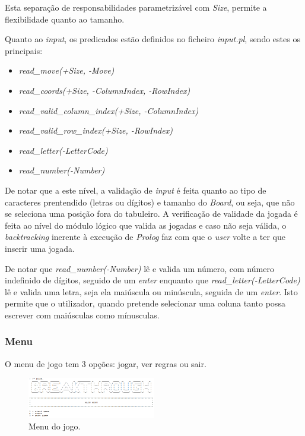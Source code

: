 \documentclass[a4paper,11pt,portuguese]{article}
\begin{document}
    \noindent Esta separação de responsabilidades parametrizável com \textit{Size}, permite
    a flexibilidade quanto ao tamanho.

    \noindent Quanto ao \textit{input}, os predicados estão definidos no ficheiro \textit{input.pl},
    sendo estes os principais:

    \begin{itemize}[topsep=4pt,itemsep=2pt]
        \item \textit{read\_move(+Size, -Move) }
        \item \textit{read\_coords(+Size, -ColumnIndex, -RowIndex) }
        \item \textit{read\_valid\_column\_index(+Size, -ColumnIndex) }
        \item \textit{read\_valid\_row\_index(+Size, -RowIndex) }
        \item \textit{read\_letter(-LetterCode) }
        \item \textit{read\_number(-Number) }
    \end{itemize}
    
    \noindent De notar que a este nível, a validação de \textit{input} é feita quanto
    ao tipo de caracteres prentendido (letras ou dígitos) e tamanho do \textit{Board},
    ou seja, que não se seleciona uma posição fora do tabuleiro. A verificação de
    validade da jogada é feita ao nível do módulo lógico que valida as jogadas e caso
    não seja válida, o \textit{backtracking} inerente à execução de \textit{Prolog}
    faz com que o \textit{user} volte a ter que inserir uma jogada.

    De notar que \textit{read\_number(-Number)} lê e valida um número, com número
    indefinido de dígitos, seguido de um \textit{enter} enquanto que
    \textit{read\_letter(-LetterCode)} lê e valida uma letra, seja ela maiúscula
    ou minúscula, seguida de um \textit{enter}. Isto permite que o utilizador,
    quando pretende selecionar uma coluna tanto possa escrever com maiúsculas
    como mínusculas.

    
    \subsubsection{Menu}
    O menu de jogo tem 3 opções: jogar, ver regras ou sair.

    \begin{figure}[H]
        \centering
        \includegraphics[width=0.5\textwidth]{imgs/main_menu.png}
        \caption{Menu do jogo.}
        \label{fig:main_menu}
    \end{figure}
\end{document}
